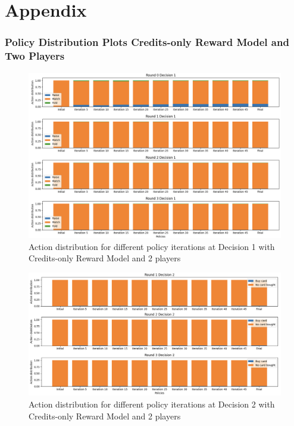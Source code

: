 \documentclass{article}
\begin{document}
\section*{Appendix}
\subsubsection*{Policy Distribution Plots Credits-only Reward Model and Two Players}
    \begin{figure}[H]
    \centering
        \includegraphics[width=\textwidth]{report/figures/r_d1.png}
        \caption{Action distribution for different policy iterations at Decision 1 with Credits-only Reward Model and 2 players}
        \label{fig:dec1_distribution}
    \end{figure}
    
    \begin{figure}[H]
    \centering
        \includegraphics[width=\textwidth]{report/figures/r_d2.png}
        \caption{Action distribution for different policy iterations at Decision 2 with Credits-only Reward Model and 2 players}
        \label{fig:dec2_distribution}
    \end{figure}
    
\end{document}
